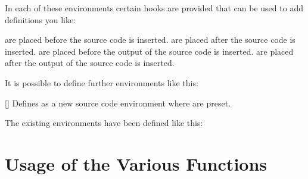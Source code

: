 \documentclass[load-preamble+,babel-options={ngerman,english}]{cnltx-doc}
\begin{document}
In each of these environments certain hooks are provided
that can be used to add definitions you like:
\begin{options}
     are placed before the source code is inserted.
     are placed after the source code is inserted.
     are placed before the output of the source code is
    inserted.
     are placed after the output of the source code is
    inserted.
\end{options}

It is possible to define further environments like this:
\begin{commands}
  []
    Defines  as a new source code environment where
     are preset.
\end{commands}

The existing environments have been defined like this:
\begin{sourcecode}
\end{sourcecode}

\section{Usage of the Various Functions}
\end{document}
